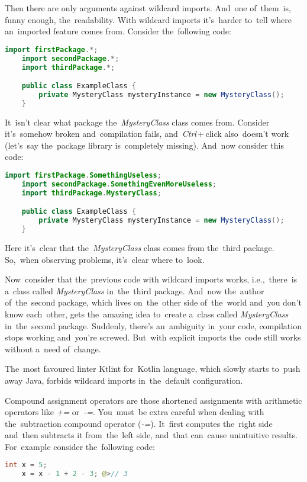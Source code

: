 Then there are only arguments against wildcard imports. And~one of~them~is, funny enough, the~readability. With wildcard imports it's~harder to~tell where an~imported feature comes from. Consider the~following code:
\begin{lstlisting}[language=Java]
    import firstPackage.*;
    import secondPackage.*;
    import thirdPackage.*;

    public class ExampleClass {
        private MysteryClass mysteryInstance = new MysteryClass();
    }
\end{lstlisting}

\noindent It~isn't clear what package the~\textit{MysteryClass} class comes from. Consider it's~somehow broken and~compilation fails, and~\textit{Ctrl}\,+\,click also~doesn't work (let's~say the~package library is~completely missing). And~now consider this code:
\begin{lstlisting}[language=Java]
    import firstPackage.SomethingUseless;
    import secondPackage.SomethingEvenMoreUseless;
    import thirdPackage.MysteryClass;

    public class ExampleClass {
        private MysteryClass mysteryInstance = new MysteryClass();
    }
\end{lstlisting}

\noindent Here it's~clear that the~\textit{MysteryClass} class comes from the~third package. So,~when observing problems, it's~clear where to~look.

Now~consider that the~previous code with wildcard imports works, i.e.,~there~is a~class called \textit{MysteryClass} in~the~third package. And~now the~author of~the~second package, which lives on~the~other side of~the~world and~you don't know each~other, gets the~amazing idea to~create a~class called \textit{MysteryClass} in~the~second package. Suddenly, there's an~ambiguity in~your code, compilation stops working and~you're screwed. But~with explicit imports the~code still works without a~need of~change.

\note The~most favoured linter Ktlint for~Kotlin language, which slowly starts to~push away Java, forbids wildcard imports in~the~default configuration.

Compound assignment operators are those shortened assignments with arithmetic operators like \mbox{\textquotesingle\textit{+=}\textquotesingle} or~\mbox{\textquotesingle\textit{-=}\textquotesingle}. You~must~be extra careful when dealing with the~subtraction compound operator (\mbox{\textquotesingle\textit{-=}\textquotesingle}). It~first computes the~right side and~then subtracts it from~the~left side, and~that can~cause unintuitive results. For~example consider the~following code:
\begin{lstlisting}[language=Java, frame=no]
    int x = 5;
    x = x - 1 + 2 - 3; @>// 3
\end{lstlisting}

